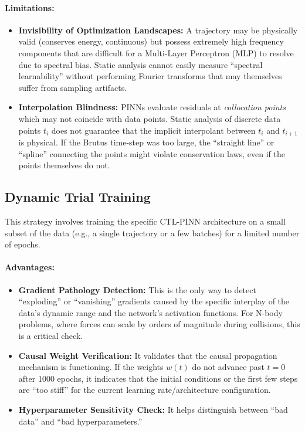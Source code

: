 \paragraph{Limitations:}
\begin{itemize}
    \item \textbf{Invisibility of Optimization Landscapes:} A trajectory may be physically valid (conserves energy, continuous) but possess extremely high frequency components that are difficult for a Multi-Layer Perceptron (MLP) to resolve due to spectral bias. Static analysis cannot easily measure ``spectral learnability'' without performing Fourier transforms that may themselves suffer from sampling artifacts.
    \item \textbf{Interpolation Blindness:} PINNs evaluate residuals at \textit{collocation points} which may not coincide with data points. Static analysis of discrete data points $t_i$ does not guarantee that the implicit interpolant between $t_i$ and $t_{i+1}$ is physical. If the Brutus time-step was too large, the ``straight line'' or ``spline'' connecting the points might violate conservation laws, even if the points themselves do not.
\end{itemize}

\subsection{Dynamic Trial Training}

This strategy involves training the specific CTL-PINN architecture on a small subset of the data (e.g., a single trajectory or a few batches) for a limited number of epochs.

\paragraph{Advantages:}
\begin{itemize}
    \item \textbf{Gradient Pathology Detection:} This is the only way to detect ``exploding'' or ``vanishing'' gradients caused by the specific interplay of the data's dynamic range and the network's activation functions. For N-body problems, where forces can scale by orders of magnitude during collisions, this is a critical check.
    \item \textbf{Causal Weight Verification:} It validates that the causal propagation mechanism is functioning. If the weights $w(t)$ do not advance past $t=0$ after 1000 epochs, it indicates that the initial conditions or the first few steps are ``too stiff'' for the current learning rate/architecture configuration.
    \item \textbf{Hyperparameter Sensitivity Check:} It helps distinguish between ``bad data'' and ``bad hyperparameters.''
\end{itemize}

